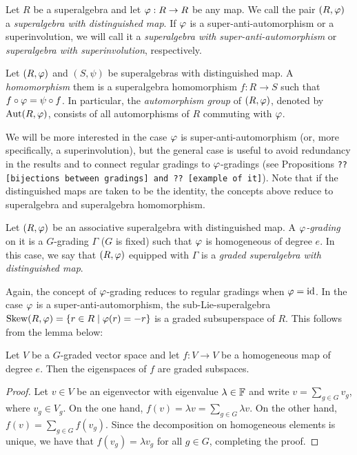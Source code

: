 \begin{defi}
	Let $R$ be a superalgebra and let $\varphi: R\to R$ be any map. We call the pair $(R, \varphi)$ a \emph{superalgebra with distinguished map}. If $\varphi$ is a super-anti-automorphism or a superinvolution, we will call it a \emph{superalgebra with super-anti-automorphism} or \emph{superalgebra with superinvolution}, respectively.
\end{defi}

\begin{defi}
	Let $(R, \varphi)$ and $(S, \psi)$ be superalgebras with distinguished map. A \emph{homomorphism} them is a superalgebra homomorphism $f: R\to S$ such that $f\circ \varphi = \psi \circ f$. In particular, the \emph{automorphism group} of $(R, \varphi)$, denoted by $\operatorname{Aut}(R, \varphi)$, consists of all automorphisms of $R$ commuting with $\varphi$.
\end{defi}

We will be more interested in the case $\varphi$ is super-anti-automorphism (or, more specifically, a superinvolution), but the general case is useful to avoid redundancy in the results and to connect regular gradings to $\varphi$-gradings (see Propositions \texttt{?? [bijections between gradings]  and ?? [example of it]}). Note that if the distinguished maps are taken to be the identity, the concepts above reduce to superalgebra and superalgebra homomorphism.

\begin{defi}
	Let $(R, \varphi)$ be an associative superalgebra with distinguished map. A \emph{$\varphi$-grading} on it is a $G$-grading $\Gamma$ ($G$ is fixed) such that $\varphi$ is homogeneous of degree $e$. In this case, we say that $(R, \varphi)$ equipped with $\Gamma$ is a \emph{graded superalgebra with distinguished map}.
\end{defi}

Again, the concept of $\varphi$-grading reduces to regular gradings when $\varphi = \operatorname{id}$. In the case $\varphi$ is a super-anti-automorphism, the sub-Lie-superalgebra $\operatorname{Skew} (R, \varphi) = \{ r\in R \mid \varphi(r) = -r \}$ is a graded subsuperspace of $R$. This follows from the lemma below:

\begin{lemma}\label{lemma:eigenvector-homogeneous}
	Let $V$ be a $G$-graded vector space and let $f: V \to V$ be a homogeneous map of degree $e$. Then the eigenspaces of $f$ are graded subspaces.
\end{lemma}

\begin{proof}
	Let $v\in V$ be an eigenvector with eigenvalue $\lambda \in \mathbb{F}$ and write $v = \sum_{g\in G} v_g$, where $v_g \in V_g$. On the one hand, $f(v) = \lambda v = \sum_{g\in G} \lambda v$. On the other hand, $f(v) = \sum_{g\in G} f(v_g)$. Since the decomposition on homogeneous elements is unique, we have that $f(v_g) = \lambda v_g$ for all $g\in G$, completing the proof.
\end{proof}

